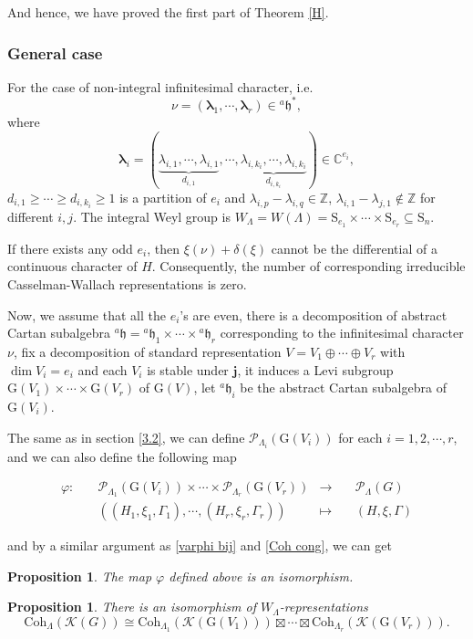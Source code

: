 \documentclass[12pt, a4paper]{amsart}
\numberwithin{equation}{section}
\newtheorem{prop}[thm]{Proposition}
\newcommand{\blam}{{\boldsymbol{\lambda}}}
\newcommand{\BC}{{\mathbb {C}}}
\newcommand{\BZ}{{\mathbb {Z}}}
\newcommand{\CK}{{\mathcal {K}}}
\newcommand{\CP}{{\mathcal {P}}}
\newcommand{\fh}{\mathfrak{h}}
\newcommand{\G}{{\mathrm{G}}}
\newcommand{\defmap}[5]{
           \begin{equation*}
              \begin{aligned}
                   #1:\quad  & #2 &\longrightarrow &\quad #3 \\
                      \quad  & #4    &\longmapsto  &\quad #5
              \end{aligned}
           \end{equation*}
          }
\begin{document}
And hence, we have proved the first part of Theorem \ref{H}.

\subsubsection{General case}
For the case of non-integral infinitesimal character, i.e. 
$$\nu = (\blam_1, \cdots, \blam_r) \in {^{a}\fh}^*,$$ 
where 
$$\blam_i = (\underbrace{\lambda_{i,1}, \cdots, \lambda_{i,1}}_{d_{i,1}},\cdots,\underbrace{\lambda_{i,k_i},\cdots,\lambda_{i,k_i}}_{d_{i,k_i}}) \in \BC^{e_i},$$ $d_{i,1} \geq \cdots \geq d_{i,k_i} \geq 1$ is a partition of $e_i$ and $\lambda_{i,p} - \lambda_{i,q} \in \BZ$, $\lambda_{i,1} - \lambda_{j,1} \notin \BZ$ for different $i,j$. The integral Weyl group is $W_{\Lambda} = W(\Lambda) = \mathrm{S}_{e_1} \times \cdots \times \mathrm{S}_{e_r} \subseteq \mathrm{S}_n$. 

If there exists any odd $e_i$, then $\xi(\nu) + \delta(\xi)$ cannot be the differential of a continuous character of $H$. Consequently, the number of corresponding irreducible Casselman-Wallach representations is zero. 

Now, we assume that all the $e_i$'s are even, there is a decomposition of abstract Cartan subalgebra $^{a}\fh = {^{a}\fh_1} \times \cdots \times {^{a}\fh_r}$ corresponding to the infinitesimal character $\nu$, fix a decomposition of standard representation $V = V_1 \oplus \cdots \oplus V_r$ with $\dim V_{i} = e_i$ and each $V_i$ is stable under $\mathbf{j}$, it induces a Levi subgroup $\G(V_1) \times \cdots \times \G(V_r)$ of $\G(V)$, let $^{a}\fh_i$ be the abstract Cartan subalgebra of $\G(V_i)$.

The same as in section \ref{3.2}, we can define $\CP_{\Lambda_i}(\G(V_i))$ for each $i = 1,2,\cdots,r$, and we can also define the following map
\defmap{\varphi}{\CP_{\Lambda_1}(\G(V_i))\times \cdots \times \CP_{\Lambda_r}(\G(V_r))}{\CP_{\Lambda}(G)}{((H_1,\xi_1,\Gamma_1), \cdots,(H_r,\xi_r,\Gamma_r))}{(H,\xi,\Gamma)}
and by a similar argument as \ref{varphi bij} and \ref{Coh cong}, we can get
\begin{prop}
    The map $\varphi$ defined above is an isomorphism.
\end{prop}

\begin{prop}
    There is an isomorphism of $W_{\Lambda}$-representations
    \begin{equation}
        \mathrm{Coh}_{\Lambda}(\CK(G)) \cong \mathrm{Coh}_{\Lambda_1}(\CK(\G(V_1))) \boxtimes \cdots \boxtimes \mathrm{Coh}_{\Lambda_r}(\CK(\G(V_r))).
    \end{equation}
\end{prop}
\end{document}
